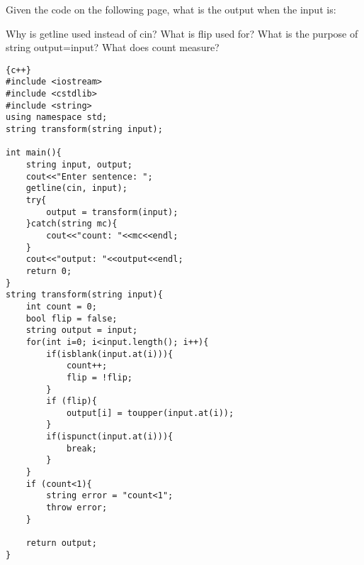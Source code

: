 \documentclass[addpoints,12pt]{exam}
\begin{document}

\begin{center}
\end{center}
\vspace{0.1in}
\begin{center}
\gradetable[h][questions]
\end{center}

\begin{questions}
\question [6]
Given the code on the following page, what is the output when the input is:

\question[1]
Why is getline used instead of cin?
\question[1]
What is flip used for?
\question[1]
What is the purpose of string output=input?
\question[1]
What does count measure?

\end{questions}
\pagebreak
\begin{lstlisting}{c++}
#include <iostream>
#include <cstdlib>
#include <string> 
using namespace std;
string transform(string input);

int main(){
	string input, output;
	cout<<"Enter sentence: ";
	getline(cin, input);
	try{
		output = transform(input);
	}catch(string mc){
		cout<<"count: "<<mc<<endl;
	}
	cout<<"output: "<<output<<endl; 
	return 0;
}
string transform(string input){
	int count = 0; 
	bool flip = false;
	string output = input;
	for(int i=0; i<input.length(); i++){ 
		if(isblank(input.at(i))){ 
			count++; 
			flip = !flip;
		}
		if (flip){
			output[i] = toupper(input.at(i));
		}
		if(ispunct(input.at(i))){
			break; 
		}
	}
	if (count<1){
		string error = "count<1";
		throw error;
	}
	
	return output;
}
\end{lstlisting}
\end{document}
